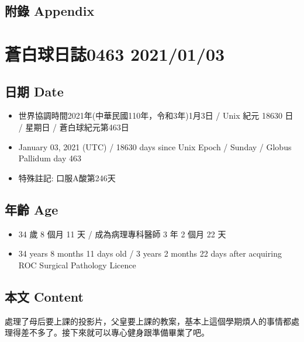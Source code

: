 \documentclass[a5paper, 11pt
]{book}
\providecommand{\tightlist}{%
  \setlength{\itemsep}{0pt}\setlength{\parskip}{0pt}}
\begin{document}
\hypertarget{ux9644ux9304-appendix-32}{%
\subsection{附錄 Appendix}\label{ux9644ux9304-appendix-32}}

\hypertarget{ux84bcux767dux7403ux65e5ux8a8c0463-20210103}{%
\section{蒼白球日誌0463
2021/01/03}\label{ux84bcux767dux7403ux65e5ux8a8c0463-20210103}}

\hypertarget{ux65e5ux671f-date-33}{%
\subsection{日期 Date}\label{ux65e5ux671f-date-33}}

\begin{itemize}
\tightlist
\item
  世界協調時間2021年(中華民國110年，令和3年)1月3日 / Unix 紀元 18630 日
  / 星期日 / 蒼白球紀元第463日
\item
  January 03, 2021 (UTC) / 18630 days since Unix Epoch / Sunday / Globus
  Pallidum day 463
\item
  特殊註記: 口服A酸第246天
\end{itemize}

\hypertarget{ux5e74ux9f61-age-33}{%
\subsection{年齡 Age}\label{ux5e74ux9f61-age-33}}

\begin{itemize}
\tightlist
\item
  34 歲 8 個月 11 天 / 成為病理專科醫師 3 年 2 個月 22 天
\item
  34 years 8 months 11 days old / 3 years 2 months 22 days after
  acquiring ROC Surgical Pathology Licence
\end{itemize}

\hypertarget{ux672cux6587-content-33}{%
\subsection{本文 Content}\label{ux672cux6587-content-33}}

處理了母后要上課的投影片，父皇要上課的教案，基本上這個學期煩人的事情都處理得差不多了。接下來就可以專心健身跟準備畢業了吧。
\end{document}
